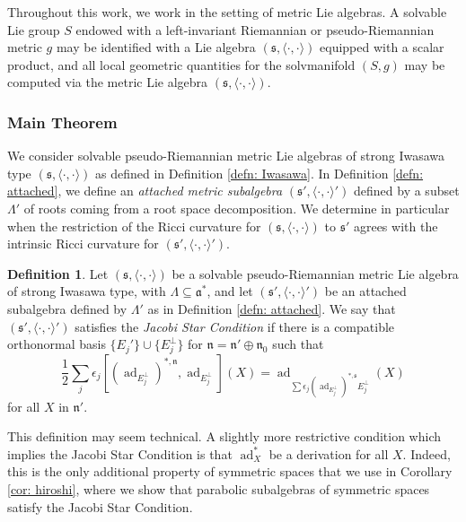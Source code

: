 \documentclass[12pt]{amsart}
\newcommand{\smallfrac}[2]{\textstyle{\frac{#1}{#2}}  }
\newcommand{\fraka}{\ensuremath{\mathfrak{a}} }
\newcommand{\frakn}{\ensuremath{\mathfrak{n}} }
\newcommand{\fraks}{\ensuremath{\mathfrak{s}} }
\newcommand\n{{\mathfrak{n}}}
\newcommand\s{{\mathfrak{s}}}
\newcommand\ip{{\langle\cdot {,} \cdot\rangle}}
\newcommand\ad{\operatorname{ad}}
\theoremstyle{plain}
\theoremstyle{definition}
\newtheorem{definition}[theorem]{Definition}
\theoremstyle{remark}
\numberwithin{equation}{section}
\numberwithin{theorem}{section}
\begin{document}
Throughout this work, we work in the setting of metric Lie algebras. 
A solvable Lie group $S$ endowed with a left-invariant Riemannian or pseudo-Riemannian metric $g$  may be identified with a Lie algebra $(\fraks,\ip)$ equipped with a scalar  product, and all local geometric quantities for the solvmanifold $(S,g)$ may be computed via the metric Lie algebra $(\fraks,\ip).$ 

\subsubsection{Main Theorem}

We consider solvable pseudo-Riemannian metric Lie algebras of strong Iwasawa type $(\fraks,\ip)$ as defined in Definition \ref{defn: Iwasawa}.
In Definition \ref{defn: attached}, we define an {\em attached metric subalgebra}
$(\fraks',\ip')$ defined by a subset $\Lambda'$ of roots coming from a root space
decomposition. 
   We determine in particular when the restriction of
the Ricci curvature for $(\fraks,\ip)$ to $\fraks'$ agrees with the intrinsic Ricci
curvature for $(\fraks',\ip')$. 
\begin{definition}\label{jacobi star} Let $(\fraks,\ip)$ be a solvable pseudo-Riemannian
metric  Lie algebra of strong Iwasawa type, with $\Lambda \subseteq \fraka^\ast$,
and let  $(\s', \ip')$ be an attached subalgebra defined by  $\Lambda'$ as in Definition
\ref{defn: attached}.  
We say that $(\fraks',\ip')$ satisfies the {\em Jacobi Star Condition}  if there is a
compatible orthonormal basis $\{E_j'\} \cup \{E_j^\perp\}$ 
for $\n = \n' \oplus \n_0$ such that
\begin{equation}\label{eq:jacobi-star}
\smallfrac{1}{2} \sum _j \epsilon_j  [(\ad_{E_j^\perp})^{\ast, \frakn} ,
\ad_{E_j^\perp}
]
(X) =
\ad_{ \sum  \epsilon_j (\ad_{E_j^\perp})^{\ast, \fraks} E_j^\perp} (X) \end{equation}
for all $X$ in $\frakn'$.  
\end{definition}
This definition may seem technical.  A slightly more restrictive condition which implies the Jacobi Star Condition is that $\ad_X^\ast$ be a derivation for all $X.$ Indeed, this is the only additional property of symmetric spaces that we use in Corollary \ref{cor: hiroshi},  where we show that parabolic subalgebras of symmetric spaces satisfy the Jacobi Star Condition.  
\end{document}
